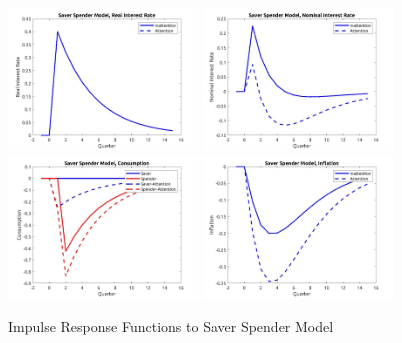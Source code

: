 \documentclass[AER]{AEA}
\begin{document}
\begin{figure}
	\includegraphics[width=0.45\textwidth]{../Code/Dynare/Figures/RealRateSS.jpg}
	\includegraphics[width=0.45\textwidth]{../Code/Dynare/Figures/NominalRateSS.jpg}
	\includegraphics[width=0.45\textwidth]{../Code/Dynare/Figures/ConsumptionSS.jpg}
	\includegraphics[width=0.45\textwidth]{../Code/Dynare/Figures/InflationSS.jpg}
	\caption{Impulse Response Functions to Saver Spender Model}
	\label{fig:IRFSS}
\end{figure}
\end{document}
